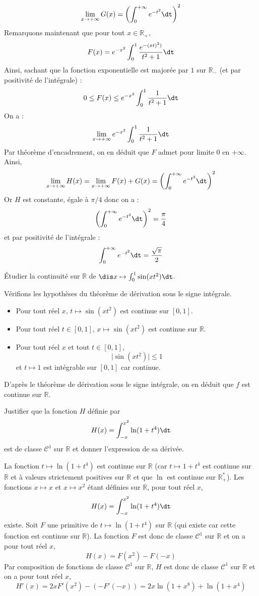 \documentclass[a4paper,10pt]{report}
\begin{document}
\begin{enumerate}
$$ \lim_{x \rightarrow + \infty} G(x) = \left( \int_{0}^{+ \infty} e^{-t^2} \dt \right)^2$$
Remarquons maintenant que pour tout $x \in \mathbb{R}_+$,
$$ F(x) = e^{-x^2} \int_{0}^1 \frac{e^{-(xt)^2)}}{t^2+1} \dt $$
Ainsi, sachant que la fonction exponentielle est majorée par $1$ sur $\mathbb{R}_{-}$ (et par positivité de l'intégrale) :
$$ 0 \leq F(x)   \leq e^{-x^2} \int_{0}^1 \frac{1}{t^2+1} \dt $$
On a :
$$ \lim_{x \rightarrow + \infty} e^{-x^2} \int_{0}^1 \frac{1}{t^2+1} \dt$$
Par théorème d'encadrement, on en déduit que $F$ admet pour limite $0$ en $+ \infty$. Ainsi,
$$ \lim_{x \rightarrow + \infty} H(x) = \lim_{x \rightarrow + \infty} F(x) + G(x) =  \left( \int_{0}^{+ \infty} e^{-t^2} \dt \right)^2$$
Or $H$ est constante, égale à $\pi/4$ donc on a :
$$ \left( \int_{0}^{+ \infty} e^{-t^2} \dt \right)^2 = \dfrac{\pi}{4}$$
et par positivité de l'intégrale :
$$  \int_{0}^{+ \infty} e^{-t^2} \dt  = \dfrac{\sqrt{\pi}}{2}$$
\end{enumerate}

\begin{Exercice}{} Étudier la continuité sur $\mathbb{R}$ de $\dis x \mapsto \int_{0}^1 \sin(xt^2) \dt$.
\end{Exercice}

\corr Vérifions les hypothèses du théorème de dérivation sous le signe intégrale.

\begin{itemize}
\item Pour tout réel $x$, $t \mapsto \sin(xt^2)$ est continue sur $[0,1]$.
\item Pour tout réel $t \in [0,1]$,  $x \mapsto \sin(xt^2)$ est continue sur $\mathbb{R}$.
\item Pour tout réel $x$ et tout $t \in [0,1]$,
$$ \vert \sin(x t^2) \vert \leq 1$$
et $t \mapsto 1$ est intégrable sur $[0,1]$ car continue.
\end{itemize}
D'après le théorème de dérivation sous le signe intégrale, on en déduit que $f$ est continue sur $\mathbb{R}$.

\begin{Exercice}{} Justifier que la fonction $H$ définie par 
$$H(x) = \int_{-x}^{x^2} \ln(1+t^4) \dt$$
est de classe $\mathcal{C}^1$ sur $\mathbb{R}$ et donner l'expression de sa dérivée.
\end{Exercice}

\corr La fonction $t \mapsto \ln(1+t^4)$ est continue sur $\mathbb{R}$ (car $t \mapsto 1+t^4$ est continue sur $\mathbb{R}$ et à valeurs strictement positives sur $\mathbb{R}$ et que $\ln$ est continue sur $\mathbb{R}_+^{*}$). Les fonctions $x \mapsto x$ et $x \mapsto x^2$ étant définies sur $\mathbb{R}$, pour tout réel $x$,
$$ H(x) = \int_{-x}^{x^2} \ln(1+t^4) \dt$$
existe. Soit $F$ une primitive de $t \mapsto \ln(1+t^4)$ sur $\mathbb{R}$ (qui existe car cette fonction est continue sur $\mathbb{R}$). La fonction $F$ est donc de classe $\mathcal{C}^1$ sur $\mathbb{R}$ et on a pour tout réel $x$,
$$ H(x) = F(x^2)-F(-x)$$
Par composition de fonctions de classe $\mathcal{C}^1$ sur $\mathbb{R}$, $H$ est donc de classe $\mathcal{C}^1$ sur $\mathbb{R}$ et on a pour tout réel $x$,
$$ H'(x) = 2x F'(x^2)-(-F'(-x)) = 2x \ln(1+x^8)+ \ln(1+x^4)$$
\end{document}
